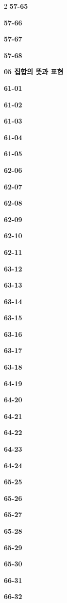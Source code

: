 \documentclass[10pt,a4paper]{article}
\begin{document}
\begin{multicols}{2}
\noindent\textbf{57-65}\ \par
\noindent\textbf{57-66}\ \par
\noindent\textbf{57-67}\ \par
\noindent\textbf{57-68}\ \par
\noindent\textbf{05 집합의 뜻과 표현}\par\smallskip
\noindent\textbf{61-01}\ \par
\noindent\textbf{61-02}\ \par
\noindent\textbf{61-03}\ \par
\noindent\textbf{61-04}\ \par
\noindent\textbf{61-05}\ \par
\noindent\textbf{62-06}\ \par
\noindent\textbf{62-07}\ \par
\noindent\textbf{62-08}\ \par
\noindent\textbf{62-09}\ \par
\noindent\textbf{62-10}\ \par
\noindent\textbf{62-11}\ \par
\noindent\textbf{63-12}\ \par
\noindent\textbf{63-13}\ \par
\noindent\textbf{63-14}\ \par
\noindent\textbf{63-15}\ \par
\noindent\textbf{63-16}\ \par
\noindent\textbf{63-17}\ \par
\noindent\textbf{63-18}\ \par
\noindent\textbf{64-19}\ \par
\noindent\textbf{64-20}\ \par
\noindent\textbf{64-21}\ \par
\noindent\textbf{64-22}\ \par
\noindent\textbf{64-23}\ \par
\noindent\textbf{64-24}\ \par
\noindent\textbf{65-25}\ \par
\noindent\textbf{65-26}\ \par
\noindent\textbf{65-27}\ \par
\noindent\textbf{65-28}\ \par
\noindent\textbf{65-29}\ \par
\noindent\textbf{65-30}\ \par
\noindent\textbf{66-31}\ \par
\noindent\textbf{66-32}\ \par

\end{multicols}
\end{document}
